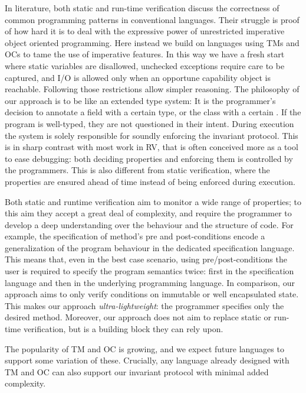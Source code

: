 
\loseSpace
In literature, both static and run-time verification discuss
the correctness of common programming patterns in conventional languages.
Their struggle is proof of how hard it is to deal with the expressive power of unrestricted imperative object oriented programming.
 Here instead we build on languages using TMs and OCs to tame the use of imperative features. In this way
we have a fresh start where static variables are disallowed, unchecked exceptions require care to be captured, and I/O is allowed only when an opportune capability object is reachable.
Following those restrictions allow simpler reasoning.
The philosophy of our approach is to be like an extended type system: 
It is the programmer's decision
to annotate a field with a certain type,
or the class with a certain \validate.
If the program is well-typed, they are not questioned in their intent.
During execution the system is solely responsible for soundly enforcing the invariant protocol.
This is in sharp contrast with most work in RV, that is often conceived more as a tool to ease debugging:
both deciding properties and enforcing them is controlled by the programmers.
This is also different from static verification,
where the properties are ensured ahead of time instead of being enforced during execution.

Both static and runtime verification
aim to monitor a wide range of properties; to this aim they accept a 
great deal of complexity, and require the programmer to develop a deep understanding
over the behaviour and the structure of code.
For example, the specification of method’s pre and post-conditions
encode a generalization of the program behaviour in the dedicated specification language.
This means that, even in the best case scenario, 
using pre/post-conditions the user is required to specify the program semantics twice:
first in the specification language and then in the underlying programming language.
In comparison, our approach aims to only verify conditions on immutable or well encapsulated state.
This makes our approach \emph{ultra-lightweight}:
the programmer specifies only the desired \validate{} method.
Moreover, our approach does not aim to replace static or run-time verification,
but is a building block they can rely upon.

The popularity of TM and OC is growing, and we expect future languages to support some variation of these.
Crucially, any language already designed with TM and OC
can also support our invariant protocol with minimal added complexity.


